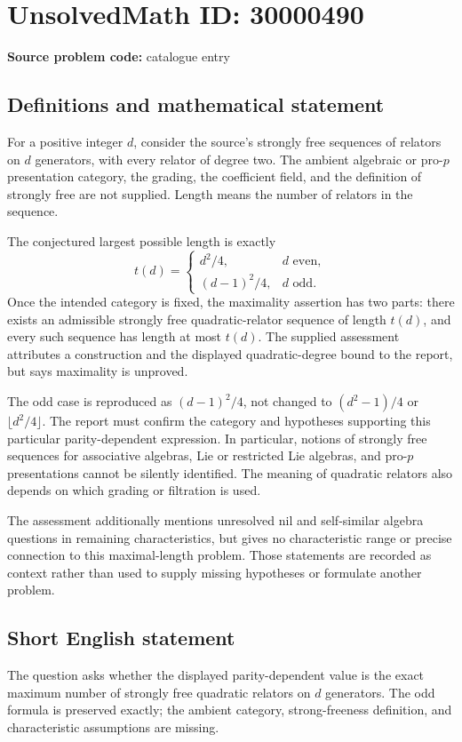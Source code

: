 \documentclass[11pt]{article}
\begin{document}
\section*{UnsolvedMath ID: 30000490}
\textbf{Source problem code:} catalogue entry
\subsection{Definitions and mathematical statement}
For a positive integer $d$, consider the source's strongly free sequences of relators on $d$ generators, with every relator of degree two. The ambient algebraic or pro-$p$ presentation category, the grading, the coefficient field, and the definition of strongly free are not supplied. Length means the number of relators in the sequence.

The conjectured largest possible length is exactly
\[
 t(d)=
 \begin{cases}
 d^2/4,&d\text{ even},\\[2pt]
 (d-1)^2/4,&d\text{ odd}.
 \end{cases}
\]
Once the intended category is fixed, the maximality assertion has two parts: there exists an admissible strongly free quadratic-relator sequence of length $t(d)$, and every such sequence has length at most $t(d)$. The supplied assessment attributes a construction and the displayed quadratic-degree bound to the report, but says maximality is unproved.

The odd case is reproduced as $(d-1)^2/4$, not changed to $(d^2-1)/4$ or $\lfloor d^2/4\rfloor$. The report must confirm the category and hypotheses supporting this particular parity-dependent expression. In particular, notions of strongly free sequences for associative algebras, Lie or restricted Lie algebras, and pro-$p$ presentations cannot be silently identified. The meaning of quadratic relators also depends on which grading or filtration is used.

The assessment additionally mentions unresolved nil and self-similar algebra questions in remaining characteristics, but gives no characteristic range or precise connection to this maximal-length problem. Those statements are recorded as context rather than used to supply missing hypotheses or formulate another problem.
\subsection{Short English statement}
The question asks whether the displayed parity-dependent value is the exact maximum number of strongly free quadratic relators on $d$ generators. The odd formula is preserved exactly; the ambient category, strong-freeness definition, and characteristic assumptions are missing.
\end{document}
